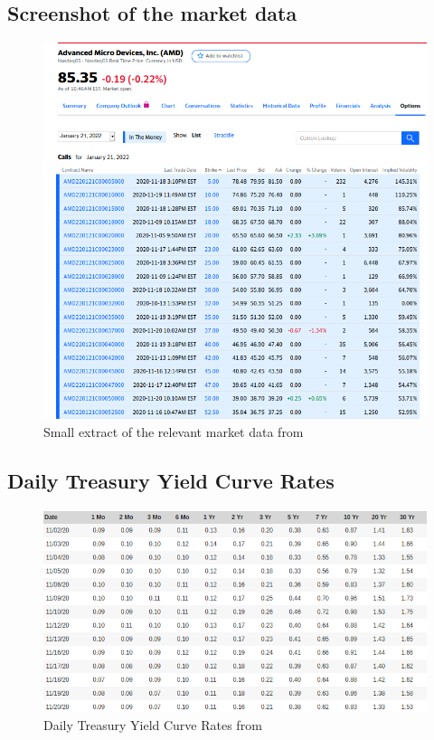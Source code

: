 \documentclass[11pt,oneside,a4paper]{article}
\begin{document}
	\subsection{Screenshot of the market data}
	\begin{figure}[H]
		\centering
		\includegraphics[width=\linewidth]{screenshot.png}
		\caption{\label{treasure}Small extract of the relevant market data from \cite{site_yahoofinance}} 
	\end{figure}
	\subsection{Daily Treasury Yield Curve Rates}
	\begin{figure}[H]
		\centering
		\includegraphics[width=0.8\linewidth]{treasure.png}
		\caption{\label{treasure}Daily Treasury Yield Curve Rates from \cite{site_treasure}} 
	\end{figure}
	\newpage
	
	
	
	 
\end{document}

